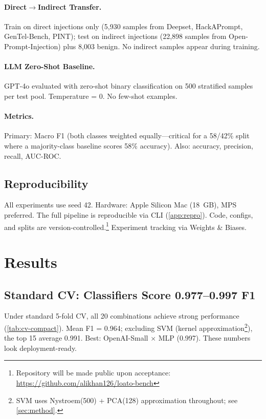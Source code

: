 \documentclass[11pt,a4paper]{article}
\newcommand{\Fone}{F1}
\begin{document}
\paragraph{Direct$\to$Indirect Transfer.}
Train on direct injections only (5,930 samples from Deepset, HackAPrompt,
GenTel-Bench, PINT); test on indirect injections (22,898 samples from
Open-Prompt-Injection) plus 8,003 benign. No indirect samples appear during
training.

\paragraph{LLM Zero-Shot Baseline.}
GPT-4o evaluated with zero-shot binary classification on 500 stratified samples
per test pool. Temperature = 0. No few-shot examples.

\paragraph{Metrics.}
Primary: Macro \Fone{} (both classes weighted equally---critical for a 58/42\%
split where a majority-class baseline scores 58\% accuracy). Also: accuracy,
precision, recall, AUC-ROC.

\subsection{Reproducibility}
\label{sec:repro}

All experiments use seed 42. Hardware: Apple Silicon Mac (18~GB), MPS preferred.
The full pipeline is reproducible via CLI (\cref{app:repro}). Code, configs, and
splits are version-controlled.\footnote{Repository will be made public upon
acceptance: \url{https://github.com/alikhan126/loato-bench}}
Experiment tracking via Weights \& Biases.

\section{Results}
\label{sec:results}

\subsection{Standard CV: Classifiers Score 0.977--0.997 \Fone{}}

Under standard 5-fold CV, all 20 combinations achieve strong performance
(\cref{tab:cv-compact}). Mean \Fone{} = 0.964; excluding SVM (kernel
approximation\footnote{SVM uses Nystroem(500) + PCA(128) approximation
throughout; see \cref{sec:method}.}), the top 15 average 0.991. Best:
OpenAI-Small $\times$ MLP (0.997). These numbers look deployment-ready.
\end{document}
